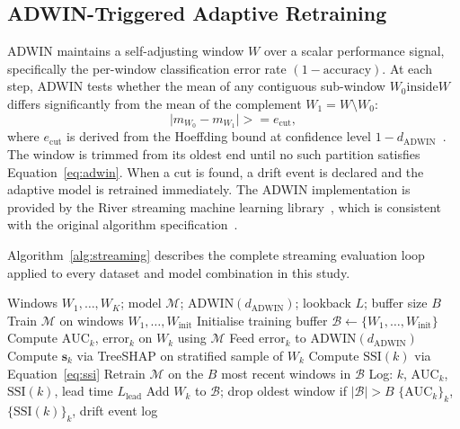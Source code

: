 \documentclass[pdflatex,sn-mathphys-num]{sn-jnl}
\theoremstyle{thmstyleone}
\theoremstyle{thmstyletwo}
\theoremstyle{thmstylethree}
\begin{document}
\subsection{ADWIN-Triggered Adaptive Retraining}\label{sec:method:adwin}

ADWIN maintains a self-adjusting window $W$ over a scalar performance signal,
specifically the per-window classification error rate $(1 - \text{accuracy})$.
At each step, ADWIN tests whether the mean of any contiguous sub-window
$W_0 \mathbin{\mathrm{inside}} W$ differs significantly from the mean of the complement
$W_1 = W \setminus W_0$:
\begin{equation}
  \bigl|m_{W_0} - m_{W_1}\bigr| \mathrel{>=} e_{\mathrm{cut}},
  \label{eq:adwin}
\end{equation}
where $e_{\mathrm{cut}}$ is derived from the Hoeffding bound at
confidence level $1 - d_{\mathrm{ADWIN}}$~\cite{bifet2007adwin}. The window is trimmed
from its oldest end until no such partition satisfies
Equation~\eqref{eq:adwin}. When a cut is found, a drift event is declared and
the adaptive model is retrained immediately. The ADWIN implementation is
provided by the River streaming machine learning library~\cite{montiel2021river},
which is consistent with the original algorithm specification~\cite{bifet2007adwin}.

Algorithm~\ref{alg:streaming} describes the complete streaming evaluation loop
applied to every dataset and model combination in this study.

\begin{algorithm}[t]
\caption{Temporal Streaming Evaluation with ADWIN and SSI Monitoring}
\label{alg:streaming}
\begin{algorithmic}[1]
  \Require Windows $W_1,\ldots,W_K$; model $\mathcal{M}$;
           $\mathrm{ADWIN}(d_{\mathrm{ADWIN}})$; lookback $L$; buffer size $B$
  \State Train $\mathcal{M}$ on windows $W_1,\ldots,W_{\mathrm{init}}$
  \State Initialise training buffer
         $\mathcal{B} \leftarrow \{W_1,\ldots,W_{\mathrm{init}}\}$
    \State Compute $\mathrm{AUC}_k$, $\mathrm{error}_k$ on $W_k$ using
           $\mathcal{M}$
    \State Feed $\mathrm{error}_k$ to $\mathrm{ADWIN}(d_{\mathrm{ADWIN}})$
    \State Compute $\mathbf{s}_k$ via TreeSHAP on stratified sample
           of $W_k$
    \State Compute $\mathrm{SSI}(k)$ via Equation~\eqref{eq:ssi}
      \State Retrain $\mathcal{M}$ on the $B$ most recent windows in
             $\mathcal{B}$
      \State Log: $k$, $\mathrm{AUC}_k$, $\mathrm{SSI}(k)$, lead time
             $L_{\mathrm{lead}}$
    \EndIf
    \State Add $W_k$ to $\mathcal{B}$; drop oldest window if
           $|\mathcal{B}| > B$
  \EndFor
  \State \Return $\{\mathrm{AUC}_k\}_k$, $\{\mathrm{SSI}(k)\}_k$,
         drift event log
\end{algorithmic}
\end{algorithm}
\end{document}
